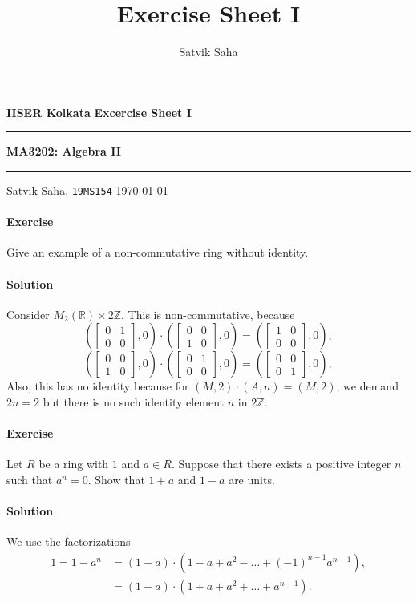 \documentclass[10pt]{article}
\title{Exercise Sheet I}
\author{Satvik Saha}
\date{}
\newcounter{prob}
\newcommand{\problem}{\stepcounter{prob}\paragraph{Exercise \arabic{prob}}}
\newcommand{\solution}{\paragraph{Solution}}
\newcommand{\R}{\mathbb{R}}
\newcommand{\Z}{\mathbb{Z}}
\begin{document}
    \noindent\textbf{IISER Kolkata} \hfill \textbf{Excercise Sheet I}
    \vspace{3pt}
    \hrule
    \vspace{3pt}
    \begin{center}
    \LARGE{\textbf{MA3202: Algebra II}}
    \end{center}
    \vspace{3pt}
    \hrule
    \vspace{3pt}
    Satvik Saha, \texttt{19MS154} \hfill \today
    \vspace{20pt}


    \problem Give an example of a non-commutative ring without identity.

    \solution Consider $M_2(\R) \times 2\Z$. This is non-commutative, because \[
        \left(\begin{bmatrix}
            0 & 1 \\ 0 & 0
        \end{bmatrix}, 0\right)\cdot \left(\begin{bmatrix}
            0 & 0 \\ 1 & 0
        \end{bmatrix}, 0\right) = \left(\begin{bmatrix}
            1  & 0 \\ 0 & 0
        \end{bmatrix}, 0\right),
    \] \[
        \left(\begin{bmatrix}
            0 & 0 \\ 1 & 0
        \end{bmatrix}, 0\right)\cdot \left(\begin{bmatrix}
            0 & 1 \\ 0 & 0
        \end{bmatrix}, 0\right) = \left(\begin{bmatrix}
            0  & 0 \\ 0 & 1
        \end{bmatrix}, 0\right),
    \] Also, this has no identity because for $(M, 2)\cdot (A, n) = (M, 2)$, we
    demand $2n = 2$ but there is no such identity element $n$ in $2\Z$.


    \problem Let $R$ be a ring with $1$ and $a \in R$. Suppose that there exists a
    positive integer $n$ such that $a^n = 0$. Show that $1 + a$ and $1 - a$ are
    units.

    \solution We use the factorizations \begin{align*}
        1 = 1 - a^n &= (1 + a)\cdot(1 - a + a^2 - \dots + (-1)^{n - 1}a^{n - 1}), \\
                    &= (1 - a)\cdot(1 + a + a^2 + \dots + a^{n - 1}).
    \end{align*}
\end{document}
